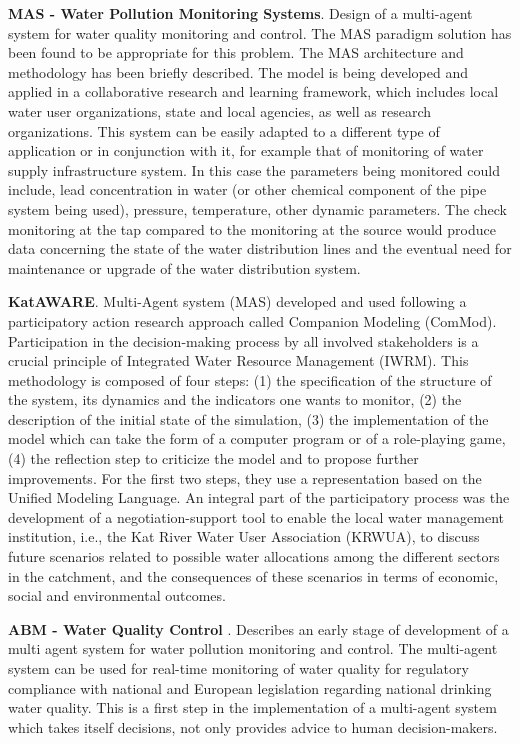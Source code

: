 \documentclass[letterpaper, 10 pt, conference]{ieeeconf}  %
\begin{document}
\textbf{MAS - Water Pollution Monitoring Systems}\cite{Oprea2006}.  Design of a multi-agent system for water quality monitoring and control.  The  MAS  paradigm solution has been found to be appropriate for this problem. The MAS architecture and methodology has been briefly described. The  model  is  being  developed and  applied  in  a  collaborative  research  and learning  framework,  which  includes  local  water user  organizations,  state  and  local  agencies,  as well as research organizations. This system can be easily adapted to a different type  of application or in conjunction with it, for example  that  of  monitoring  of  water  supply infrastructure system. In this case the parameters being monitored could include, lead concentration in water (or other chemical component of the pipe system  being  used),  pressure,  temperature,  other dynamic parameters. The check monitoring at the tap  compared  to  the  monitoring  at  the  source would  produce  data  concerning  the  state  of  the water distribution lines and the eventual need for maintenance or upgrade of the water distribution system. 

\textbf{KatAWARE}\cite{Farolfi2010}. Multi-Agent system (MAS) developed and used following a participatory action research approach called Companion Modeling (ComMod). Participation in the decision-making process by all involved stakeholders is a crucial principle of Integrated Water Resource Management (IWRM). This methodology is composed of four steps: (1) the specification of the structure of the system, its dynamics and the indicators one wants to monitor, (2) the description of the initial state of the simulation, (3) the implementation of the model which can take the form of a computer program or of a role-playing game, (4) the reflection step to criticize the model and to propose further improvements. For the first two steps, they use a representation based on the Unified Modeling Language. An integral part of the participatory process was the development of a negotiation-support tool to enable the local water management institution, i.e., the Kat River Water User Association (KRWUA), to discuss future scenarios related to possible water allocations among the different sectors in the catchment, and the consequences of these scenarios in terms of economic, social and environmental outcomes.

\textbf{ABM - Water Quality Control} \cite{Nichita2007}. Describes  an  early stage  of  development  of  a  multi  agent  system  for  water  pollution  monitoring and  control.  The  multi-agent  system  can  be  used  for  real-time  monitoring  of water quality for regulatory compliance with national and European legislation regarding  national  drinking  water  quality.  This  is  a  first  step  in  the implementation of a multi-agent system which takes itself decisions, not only provides advice to human decision-makers. 
\end{document}
